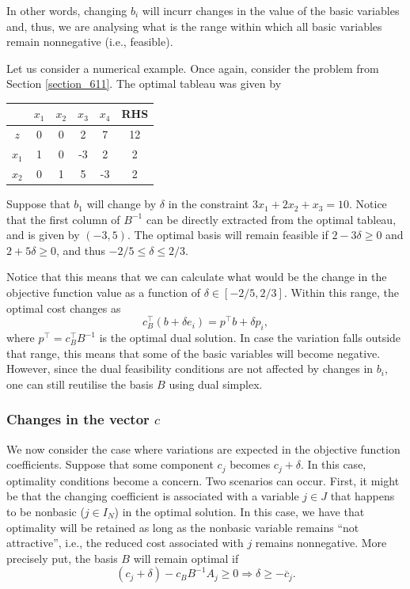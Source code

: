 In other words, changing $b_i$ will incurr changes in the value of the basic variables and, thus, we are analysing what is the range within which all basic variables remain nonnegative (i.e., feasible).

Let us consider a numerical example. Once again, consider the problem from Section \ref{section_611}. The optimal tableau was given by

\begin{center}
	\begin{tabular}{c|cccc|c} 
	   &$x_1$ & $x_2$ & $x_3$ & $x_4$& RHS \\ \hline	
	   $z$ & 0 & 0 & 2 & 7 & 12\\
	   $x_1$ & 1 & 0 & -3 & 2 & 2\\
	   $x_2$ & 0 & 1 & 5 & -3 & 2\\	            
	\end{tabular}	
\end{center}

Suppose that $b_1$ will change by $\delta$ in the constraint $3x_1 + 2x_2 + x_3  = 10$. Notice that the first column of $B^{-1}$ can be directly extracted from the optimal tableau, and is given by $(-3,5)$. The optimal basis will remain feasible if $2 - 3\delta \geq 0$ and $2 + 5\delta \geq 0$, and thus $-2/5 \leq \delta \leq 2/3$.

Notice that this means that we can calculate what would be the change in the objective function value as a function of $\delta \in [-2/5, 2/3]$. Within this range, the optimal cost changes as 
%
\begin{equation*}
	c_B^\top (b + \delta e_i) = p^\top b + \delta p_i,	
\end{equation*}
%
where $p^\top = c_B ^\top B^{-1}$ is the optimal dual solution. In case the variation falls outside that range, this means that some of the basic variables will become negative. However, since the dual feasibility conditions are not affected by changes in $b_i$, one can still reutilise the basis $B$ using dual simplex.


\subsubsection{Changes in the vector $c$}

We now consider the case where variations are expected in the  objective function coefficients. Suppose that some component $c_j$ becomes $c_j + \delta$. In this case, optimality conditions become a concern. Two scenarios can occur. First, it might be that the changing coefficient is associated with a variable $j \in J$ that happens to be nonbasic ($j \in I_N$) in the optimal solution. In this case, we have that optimality will be retained as long as the nonbasic variable remains ``not attractive'', i.e., the reduced cost associated with $j$ remains nonnegative. More precisely put, the basis $B$ will remain optimal if
%
\begin{equation*}
	(c_j + \delta) - c_BB^{-1}A_j \geq 0 \Rightarrow \delta \geq -\overline{c}_j.
\end{equation*}
%

